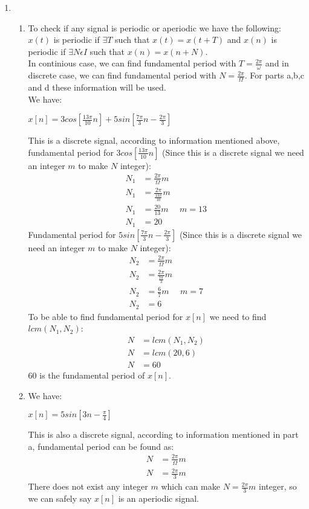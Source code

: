 \documentclass[10pt,a4paper, margin=1in]{article}
\begin{document}
\begin{enumerate}
\newpage

\item 
    \begin{enumerate}
    \item To check if any signal is periodic or aperiodic we have the following: \\ $x(t)$ is periodic if $\exists T$ such that $x(t) = x(t+T)$ and $x(n)$ is periodic if $\exists N \epsilon I$ such that $x(n) = x(n+N)$. \\
     In continious case, we can find fundamental period with $T=\frac{2\pi}{\omega}$ and in discrete case, we can find fundamental period with $N=\frac{2\pi}{\Omega}$. For parts a,b,c and d these information will be used. \\
We have: \\
\begin{center}
$x[n] = 3cos[\frac{13\pi}{10}n] + 5sin[\frac{7\pi}{3}n - \frac{2\pi}{3}]$ 
\end{center}
This is a discrete signal, according to information mentioned above, fundamental period for $3cos[\frac{13\pi}{10}n]$ (Since this is a discrete signal we need an integer $m$ to make $N$ integer):
\begin{align*}
N_1&=\frac{2\pi}{\Omega}m \\
N_1&=\frac{2\pi}{\frac{13\pi}{10}}m \\
N_1&=\frac{20}{13}m \ \ \ \ \ \ m = 13 \\
N_1&=20
\end{align*}
Fundamental period for $5sin[\frac{7\pi}{3}n - \frac{2\pi}{3}]$ (Since this is a discrete signal we need an integer $m$ to make $N$ integer):
\begin{align*}
N_2&=\frac{2\pi}{\Omega}m \\
N_2&=\frac{2\pi}{\frac{7\pi}{3}}m \\
N_2&=\frac{6}{7}m \ \ \ \ \ \ m = 7 \\
N_2&=6
\end{align*}
To be able to find fundamental period for $x[n]$ we need to find $lcm(N_1,N_2)$:
\begin{align*}
N &= lcm(N_1,N_2) \\
N &= lcm(20,6) \\
N&=60
\end{align*}
60 is the fundamental period of $x[n]$.\\

    \item We have: 
\begin{center}
$x[n] = 5sin[3n - \frac{\pi}{4}]$ 
\end{center}
This is also a discrete signal, according to information mentioned in part a, fundamental period can be found as:
\begin{align*}
N&=\frac{2\pi}{\Omega}m \\
N&=\frac{2\pi}{3}m
\end{align*}
There does not exist any integer $m$ which can make $N=\frac{2\pi}{3}m$ integer, so we can safely say $x[n]$ is an aperiodic signal. \\
    

\end{enumerate}
\end{enumerate}
\end{document}
